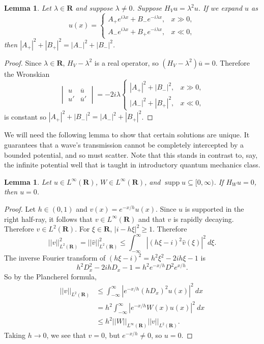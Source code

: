 \documentclass[12pt]{report}
\newcommand{\RR}{\mathbf{R}}
\DeclareMathOperator{\supp}{supp}
\newtheorem{lemma}[theorem]{Lemma}
\theoremstyle{definition}
\begin{document}
\begin{lemma}
\label{no outgoing solutions, part 1}
Let $\lambda \in \RR$ and suppose $\lambda \neq 0$. Suppose $H_Vu = \lambda^2u$. If we expand $u$ as
$$u(x) = \begin{cases}
  A_+ e^{i\lambda x} + B_-e^{-i\lambda x}, &x \gg 0,\\
  A_- e^{i\lambda x} + B_+e^{-i\lambda x}, &x \ll 0,
\end{cases}$$
then $|A_+|^2 + |B_+|^2 = |A_-|^2 + |B_-|^2$.
\end{lemma}
\begin{proof}
Since $\lambda \in \RR$, $H_V - \lambda^2$ is a real operator, so $(H_V - \lambda^2) \overline u = 0$. Therefore the Wronskian
$$\begin{vmatrix}
u&\overline u\\u' & \overline u'
\end{vmatrix} = -2i\lambda \begin{cases}
|A_+|^2 + |B_-|^2, &x \gg 0,\\
|A_-|^2 + |B_+|^2, &x \ll 0,
\end{cases}$$
is constant so $|A_+|^2 + |B_-|^2 = |A_-|^2 + |B_+|^2$.
\end{proof}

We will need the following lemma to show that certain solutions are unique. It guarantees that a wave's transmission cannot be completely intercepted by a bounded potential, and so must scatter. Note that this stands in contrast to, say, the infinite potential well that is taught in introductory quantum mechanics class.
\begin{lemma}
\label{bounded potentials must scatter}
Let $u \in L^\infty(\RR)$, $W \in L^\infty(\RR)$, and $\supp u \subseteq [0, \infty)$. If $H_Wu = 0$, then $u = 0$.
\end{lemma}
\begin{proof}
Let $h \in (0, 1)$ and $v(x) = e^{-x/h}u(x)$. Since $u$ is supported in the right half-ray, it follows that $v \in L^\infty(\RR)$ and that $v$ is rapidly decaying. Therefore $v \in L^2(\RR)$. For $\xi \in \RR$, $|i - h\xi|^2 \geq 1$. Therefore
$$||v||_{L^2(\RR)}^2 = ||\hat v||_{L^2(\RR)}^2 \leq \int_{-\infty}^\infty |(h\xi - i)^2\hat v(\xi)|^2 ~d\xi.$$
The inverse Fourier transform of $(h\xi - i)^2 = h^2\xi^2 - 2ih\xi - 1$ is
$$h^2D^2_x - 2ihD_x - 1 = h^2 e^{-x/h} D^2 e^{x/h}.$$
So by the Plancherel formula,
\begin{align*}
  ||v||_{L^2(\RR)} &\leq \int_{-\infty}^\infty |e^{-x/h}(hD_x)^2 u(x)|^2 ~dx
  \\&= h^2 \int_{-\infty}^\infty |e^{-x/h}W(x)u(x)|^2 ~dx
  \\&\leq h^2 ||W||_{L^\infty(\RR)} ||v||_{L^2(\RR)}.
\end{align*}
Taking $h \to 0$, we see that $v = 0$, but $e^{-x/h} \neq 0$, so $u = 0$.
\end{proof}
\end{document}
